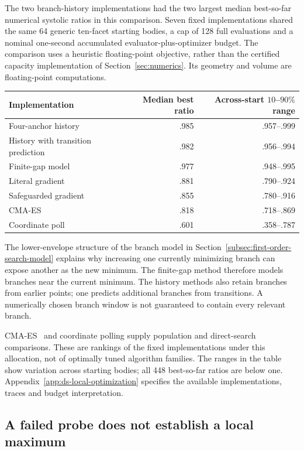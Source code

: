 The two branch-history implementations had the two largest median
best-so-far numerical systolic ratios in this comparison. Seven fixed
implementations shared the same 64 generic ten-facet starting bodies, a cap
of 128 full evaluations and a nominal one-second accumulated
evaluator-plus-optimizer budget. The comparison uses a heuristic
floating-point objective, rather than the certified capacity implementation
of Section~\ref{sec:numerics}. Its geometry and volume are floating-point
computations.
\begin{center}
\begin{tabular}{lrr}
\hline
Implementation & Median best ratio & Across-start $10$--$90\%$ range\\
\hline
Four-anchor history & .985 & .957--.999\\
History with transition prediction & .982 & .956--.994\\
Finite-gap model & .977 & .948--.995\\
Literal gradient & .881 & .790--.924\\
Safeguarded gradient & .855 & .780--.916\\
CMA-ES & .818 & .718--.869\\
Coordinate poll & .601 & .358--.787\\
\hline
\end{tabular}
\end{center}
The lower-envelope structure of the branch model in
Section~\ref{subsec:first-order-search-model} explains why increasing one
currently minimizing branch can expose another as the new minimum. The
finite-gap method therefore models branches near the current minimum.
The history methods also retain branches from earlier points; one predicts
additional branches from transitions. A numerically chosen branch window
is not guaranteed to contain every relevant branch.

CMA-ES~\cite{dsHansen2016} and coordinate polling supply population and
direct-search comparisons. These are rankings of the fixed implementations
under this allocation, not of optimally tuned algorithm families. The ranges
in the table show variation across starting bodies; all 448 best-so-far
ratios are below one. Appendix~\ref{app:ds-local-optimization} specifies the
available implementations, traces and budget interpretation.

\subsection{A failed probe does not establish a local maximum}

